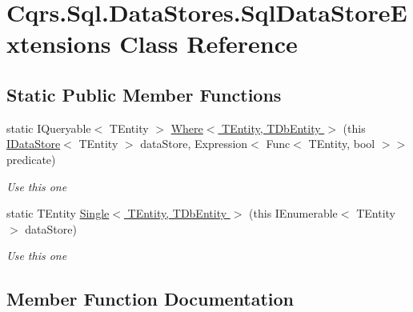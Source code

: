 \hypertarget{classCqrs_1_1Sql_1_1DataStores_1_1SqlDataStoreExtensions}{}\section{Cqrs.\+Sql.\+Data\+Stores.\+Sql\+Data\+Store\+Extensions Class Reference}
\label{classCqrs_1_1Sql_1_1DataStores_1_1SqlDataStoreExtensions}
\subsection*{Static Public Member Functions}
\begin{DoxyCompactItemize}
\item 
static I\+Queryable$<$ T\+Entity $>$ \hyperlink{classCqrs_1_1Sql_1_1DataStores_1_1SqlDataStoreExtensions_a77e339885a9e26ff6bcf5b5bbe24b19d}{Where$<$ T\+Entity, T\+Db\+Entity $>$} (this \hyperlink{interfaceCqrs_1_1DataStores_1_1IDataStore}{I\+Data\+Store}$<$ T\+Entity $>$ data\+Store, Expression$<$ Func$<$ T\+Entity, bool $>$$>$ predicate)
\begin{DoxyCompactList}\small\item\em Use this one \end{DoxyCompactList}\item 
static T\+Entity \hyperlink{classCqrs_1_1Sql_1_1DataStores_1_1SqlDataStoreExtensions_aff2943b536ef4fa182ce8b5194d65d86}{Single$<$ T\+Entity, T\+Db\+Entity $>$} (this I\+Enumerable$<$ T\+Entity $>$ data\+Store)
\begin{DoxyCompactList}\small\item\em Use this one \end{DoxyCompactList}\end{DoxyCompactItemize}


\subsection{Member Function Documentation}
\mbox{\label{classCqrs_1_1Sql_1_1DataStores_1_1SqlDataStoreExtensions_aff2943b536ef4fa182ce8b5194d65d86}} 
